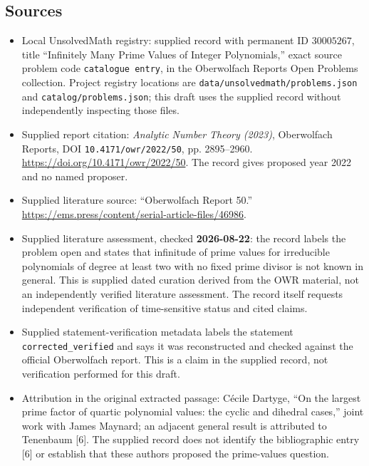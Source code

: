 \documentclass[11pt]{article}
\begin{document}
\subsection{Sources}
\begin{itemize}
\item Local UnsolvedMath registry: supplied record with permanent ID \(30005267\), title ``Infinitely Many Prime Values of Integer Polynomials,'' exact source problem code \texttt{catalogue entry}, in the Oberwolfach Reports Open Problems collection. Project registry locations are \texttt{data/unsolvedmath/problems.json} and \texttt{catalog/problems.json}; this draft uses the supplied record without independently inspecting those files.
\item Supplied report citation: \emph{Analytic Number Theory (2023)}, Oberwolfach Reports, DOI \texttt{10.4171/owr/2022/50}, pp. 2895--2960. \url{https://doi.org/10.4171/owr/2022/50}. The record gives proposed year 2022 and no named proposer.
\item Supplied literature source: ``Oberwolfach Report 50.'' \url{https://ems.press/content/serial-article-files/46986}.
\item Supplied literature assessment, checked \textbf{2026-08-22}: the record labels the problem open and states that infinitude of prime values for irreducible polynomials of degree at least two with no fixed prime divisor is not known in general. This is supplied dated curation derived from the OWR material, not an independently verified literature assessment. The record itself requests independent verification of time-sensitive status and cited claims.
\item Supplied statement-verification metadata labels the statement \texttt{corrected\_verified} and says it was reconstructed and checked against the official Oberwolfach report. This is a claim in the supplied record, not verification performed for this draft.
\item Attribution in the original extracted passage: C\'ecile Dartyge, ``On the largest prime factor of quartic polynomial values: the cyclic and dihedral cases,'' joint work with James Maynard; an adjacent general result is attributed to Tenenbaum [6]. The supplied record does not identify the bibliographic entry [6] or establish that these authors proposed the prime-values question.
\end{itemize}
\end{document}

